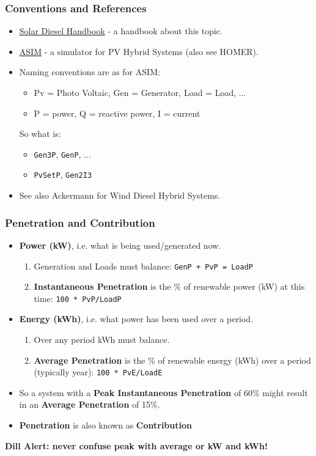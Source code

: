 \documentclass[a4paper,handout]{beamer}
\def\dill#1{\textcolor{RawSienna}{\textbf{Dill Alert: #1}}}
\begin{document}
\begin{frame}\frametitle{Conventions and References}
  \begin{itemize}
  \item \href{http://www.powerwater.com.au/solardiesel}{Solar
      Diesel Handbook} - a handbook about this topic.
    \pause
  \item \href{http://www.powerwater.com.au/solardiesel}{ASIM} - a
    simulator for PV Hybrid Systems (also see HOMER).
    \pause
  \item Naming conventions are as for ASIM: 
    \begin{itemize}
    \item Pv = Photo Voltaic, Gen = Generator, Load = Load, ...
    \item P = power, Q = reactive power, I = current
    \end{itemize}
    So what is:
    \begin{itemize}
    \item \texttt{Gen3P}, \texttt{GenP}, ...
    \item \texttt{PvSetP}, \texttt{Gen2I3}
    \end{itemize}
    \pause 
  \item See also Ackermann for Wind Diesel Hybrid Systems.
  \end{itemize}
\end{frame}

\begin{frame}\frametitle{Penetration and Contribution}
  \begin{itemize}
  \item \textbf{Power (kW)}, i.e. what is being used/generated now.
    \pause
    \begin{enumerate}
    \item Generation and Loads must balance: \texttt{GenP + PvP = LoadP}
    \item \textbf{Instantaneous Penetration} is the 
      \% of renewable power (kW) at this time: \texttt{100 * PvP/LoadP}
    \end{enumerate}
    \pause
  \item \textbf{Energy (kWh)}, i.e. what power has been used over a
    period.
    \pause
    \begin{enumerate}
    \item Over any period kWh must balance.
    \item \textbf{Average Penetration} is the \% of renewable energy
      (kWh) over a period (typically year): \texttt{100 * PvE/LoadE}
    \end{enumerate}
    \pause
  \item So a system with a \textbf{Peak Instantaneous Penetration} of
    60\% might result in an \textbf{Average Penetration} of 15\%.
  \item \textbf{Penetration} is also known as \textbf{Contribution}
    \pause
  \end{itemize}
  \dill{never confuse peak with average or kW and kWh!}

\end{frame}
\end{document}
